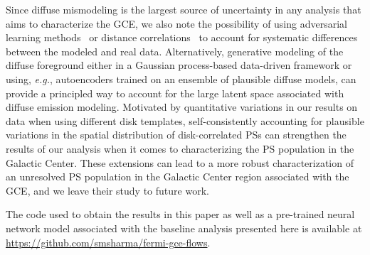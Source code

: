 \documentclass[prd,aps,10pt,nofootinbib,twocolumn,superscriptaddress,preprintnumbers,balancelastpage,longbibliography,floatfix]{revtex4-2}
\begin{document}
Since diffuse mismodeling is the largest source of uncertainty in any analysis that aims to characterize the GCE, we also note the possibility of using adversarial learning methods~\cite{Louppe:2016ylz} or distance correlations~\cite{Kasieczka:2020yyl} to account for systematic differences between the modeled and real \Fermi data. Alternatively, generative modeling of the diffuse foreground either in a Gaussian process-based data-driven framework or using, \emph{e.g.}, autoencoders trained on an ensemble of plausible diffuse models, can provide a principled way to account for the large latent space associated with diffuse emission modeling. Motivated by quantitative variations in our results on \Fermi data when using different disk templates, self-consistently accounting for plausible variations in the spatial distribution of disk-correlated PSs can strengthen the results of our analysis when it comes to characterizing the PS population in the Galactic Center. 
These extensions can lead to a more robust characterization of an unresolved PS population in the Galactic Center region associated with the GCE, and we leave their study to future work.

The code used to obtain the results in this paper as well as a pre-trained neural network model associated with the baseline analysis presented here is available at \url{https://github.com/smsharma/fermi-gce-flows}.

\vspace{.2cm}
\end{document}
